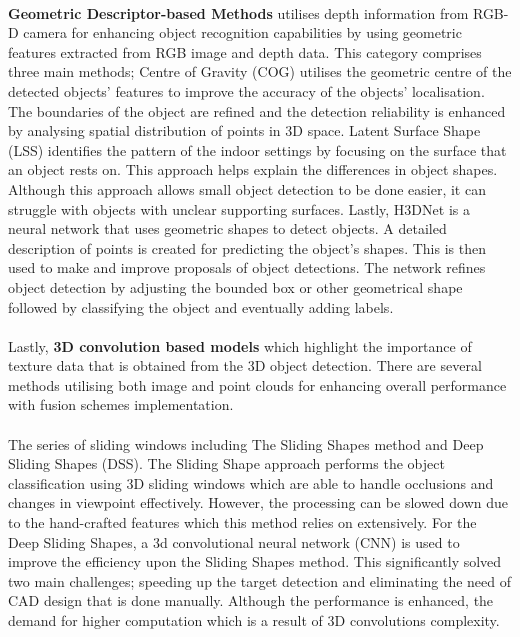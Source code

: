 \paragraph*{}
\textbf{Geometric Descriptor-based Methods} utilises depth information from RGB-D camera for enhancing object recognition capabilities by using geometric features extracted from RGB image and depth data. This category comprises three main methods; Centre of Gravity (COG) utilises the geometric centre of the detected objects’ features to improve the accuracy of the objects’ localisation. The boundaries of the object are refined and the detection reliability is enhanced by analysing spatial distribution of points in 3D space. Latent Surface Shape (LSS) identifies the pattern of the indoor settings by focusing on the surface that an object rests on. This approach helps explain the differences in object shapes. Although this approach allows small object detection to be done easier, it can struggle with objects with unclear supporting surfaces\cite{ren2018three}. Lastly, H3DNet\cite{zhang2020h3dnet} is a neural network that uses geometric shapes to detect objects. A detailed description of points is created for predicting the object's shapes. This is then used to make and improve proposals of object detections. The network refines object detection by adjusting the bounded box or other geometrical shape followed by classifying the object and eventually adding labels\cite{wang2021recent}.

\paragraph*{}
Lastly, \textbf{3D convolution based models} which highlight the importance of texture data that is obtained from the 3D object detection. There are several methods utilising both image and point clouds for enhancing overall performance with fusion schemes implementation. 

\paragraph*{}
The series of sliding windows including The Sliding Shapes method and Deep Sliding Shapes (DSS). The Sliding Shape approach performs the object classification using 3D sliding windows which are able to handle occlusions and changes in viewpoint effectively. However, the processing can be slowed down due to the hand-crafted features which this method relies on extensively. For the Deep Sliding Shapes, a 3d convolutional neural network (CNN) is used to improve the efficiency upon the Sliding Shapes method. This significantly solved two main challenges; speeding up the target detection and eliminating the need of CAD design that is done manually. Although the performance is enhanced, the demand for higher computation which is a result of 3D convolutions complexity. 

